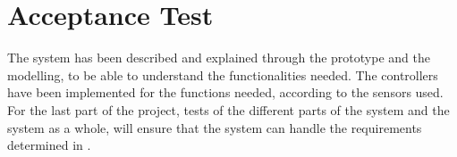 \chapter{Acceptance Test}\label{cha:AcceptTest}

The system has been described and explained through the prototype and the modelling, to be able to understand the functionalities needed. The controllers have been implemented for the functions needed, according to the sensors used. For the last part of the project, tests of the different parts of the system and the system as a whole, will ensure that the system can handle the requirements determined in .